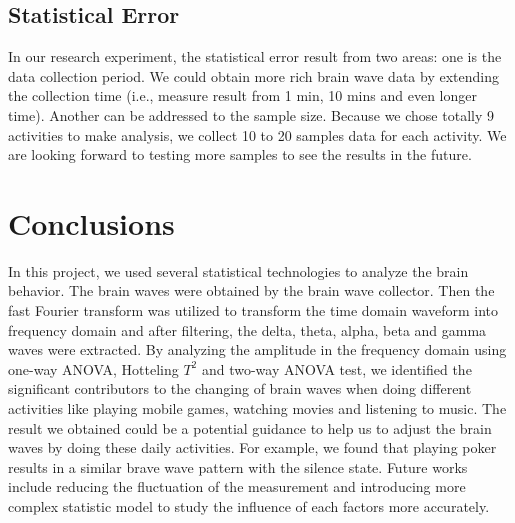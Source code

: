 \documentclass[letterpaper,twocolumn,10pt]{article}
\begin{document}
\subsection{Statistical Error}

In our research experiment, the statistical error result from two areas: one is the data collection period. We could obtain more rich brain wave data by extending the collection time (i.e., measure result from 1 min, 10 mins and even longer time). Another can be addressed to the sample size. Because we chose totally 9 activities to make analysis, we collect 10 to 20 samples data for each activity. We are looking forward to testing more samples to see the results in the future.

\section{Conclusions}
In this project, we used several statistical technologies to analyze the brain behavior. The brain waves were obtained by the brain wave collector. Then the fast Fourier transform was utilized to transform the time domain waveform into frequency domain and after filtering, the delta, theta, alpha, beta and gamma waves were extracted. By analyzing the amplitude in the frequency domain using one-way ANOVA, Hotteling $T^2$ and two-way ANOVA test, we identified the significant contributors to the changing of brain waves when doing different activities like playing mobile games, watching movies and listening to music. The result we obtained could be a potential guidance to help us to adjust the brain waves by doing these daily activities. For example, we found that playing poker results in a similar brave wave pattern with the silence state. Future works include reducing the fluctuation of the measurement and introducing more complex statistic model to study the influence of each factors more accurately.

{\normalsize

% 
}


\end{document}
